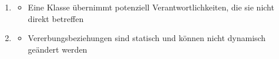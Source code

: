 \begin{infoBox}[title=Vererbung]
\begin{enumerate}
\begin{itemize}
        \end{itemize}
        \item {}
        \begin{itemize}
            \item Eine Klasse übernimmt potenziell Verantwortlichkeiten, die sie nicht direkt betreffen
        \end{itemize}
        \item {}
        \begin{itemize}
            \item Vererbungsbeziehungen sind statisch und können nicht dynamisch geändert werden
        \end{itemize}
    \end{enumerate}
\end{infoBox}
